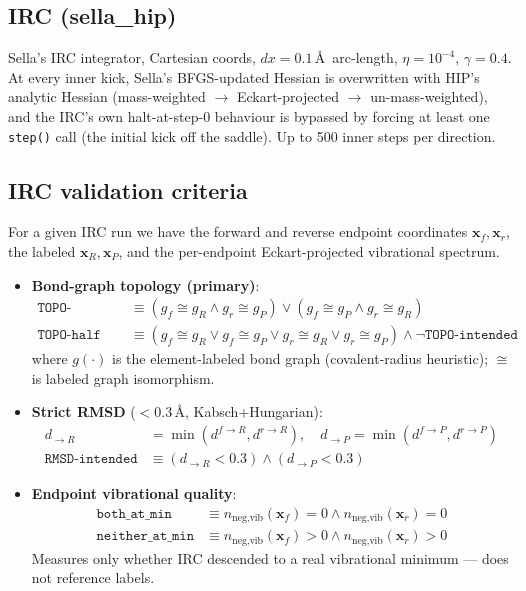 \documentclass[11pt]{article}
\begin{document}
\subsection{IRC (sella\_hip)}

Sella's IRC integrator, Cartesian coords, $dx{=}0.1$\,\AA\ arc-length,
$\eta{=}10^{-4}$, $\gamma{=}0.4$. At every inner kick, Sella's
BFGS-updated Hessian is overwritten with HIP's analytic Hessian
(mass-weighted $\to$ Eckart-projected $\to$ un-mass-weighted), and the
IRC's own halt-at-step-0 behaviour is bypassed by forcing at least one
\texttt{step()} call (the initial kick off the saddle). Up to 500
inner steps per direction.

\subsection{IRC validation criteria}

For a given IRC run we have the forward and reverse endpoint
coordinates $\mathbf{x}_f, \mathbf{x}_r$, the labeled
$\mathbf{x}_R, \mathbf{x}_P$, and the per-endpoint Eckart-projected
vibrational spectrum.

\begin{itemize}[nosep,leftmargin=1.5em]
\item \textbf{Bond-graph topology (primary)}:
\begin{align*}
\texttt{TOPO-intended} &\equiv
  (g_f \cong g_R \wedge g_r \cong g_P) \vee
  (g_f \cong g_P \wedge g_r \cong g_R) \\
\texttt{TOPO-half} &\equiv
  (g_f{\cong}g_R \vee g_f{\cong}g_P \vee g_r{\cong}g_R \vee g_r{\cong}g_P)
  \wedge \neg \texttt{TOPO-intended}
\end{align*}
where $g(\cdot)$ is the element-labeled bond graph (covalent-radius
heuristic); $\cong$ is labeled graph isomorphism.

\item \textbf{Strict RMSD} ($< 0.3$\,\AA, Kabsch+Hungarian):
\begin{align*}
d_{\to R} &= \min(d^{f \to R}, d^{r \to R}),\quad d_{\to P} = \min(d^{f \to P}, d^{r \to P}) \\
\texttt{RMSD-intended} &\equiv (d_{\to R} < 0.3) \wedge (d_{\to P} < 0.3)
\end{align*}

\item \textbf{Endpoint vibrational quality}:
\begin{align*}
\texttt{both\_at\_min} &\equiv n_{\text{neg,vib}}(\mathbf{x}_f){=}0 \wedge n_{\text{neg,vib}}(\mathbf{x}_r){=}0 \\
\texttt{neither\_at\_min} &\equiv n_{\text{neg,vib}}(\mathbf{x}_f){>}0 \wedge n_{\text{neg,vib}}(\mathbf{x}_r){>}0
\end{align*}
Measures only whether IRC descended to a real vibrational minimum --- does
not reference labels.
\end{itemize}
\end{document}
